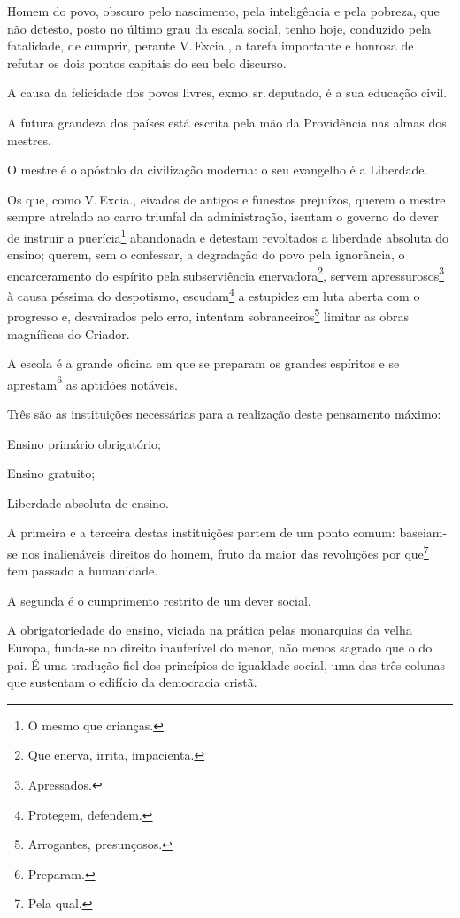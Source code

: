 Homem do povo, obscuro pelo nascimento, pela inteligência e pela
pobreza, que não detesto, posto no último grau da escala social, tenho
hoje, conduzido pela fatalidade, de cumprir, perante V.\,Excia., a tarefa
importante e honrosa de refutar os dois pontos capitais do seu belo
discurso.

A causa da felicidade dos povos livres, exmo.\,sr.\,deputado, é a sua
educação civil.

A futura grandeza dos países está escrita pela mão da Providência nas
almas dos mestres.

O mestre é o apóstolo da civilização moderna: o seu evangelho é a
Liberdade.

Os que, como V.\,Excia., eivados de antigos e funestos prejuízos, querem
o mestre sempre atrelado ao carro triunfal da administração, isentam o
governo do dever de instruir a puerícia\footnote{O mesmo que crianças.}
abandonada e detestam revoltados a liberdade absoluta do ensino; querem,
sem o confessar, a degradação do povo pela ignorância, o encarceramento
do espírito pela subserviência enervadora\footnote{Que enerva, irrita,
  impacienta.}, servem apressurosos\footnote{Apressados.} à causa
péssima do despotismo, escudam\footnote{Protegem, defendem.} a
estupidez em luta aberta com o progresso e, desvairados pelo erro,
intentam sobranceiros\footnote{Arrogantes, presunçosos.} limitar as
obras magníficas do Criador.

A escola é a grande oficina em que se preparam os grandes espíritos e se
aprestam\footnote{Preparam.} as aptidões notáveis.

Três são as instituições necessárias para a realização deste pensamento
máximo:

Ensino primário obrigatório;

Ensino gratuito;

Liberdade absoluta de ensino.

A primeira e a terceira destas instituições partem de um ponto comum:
baseiam-se nos inalienáveis direitos do homem, fruto da maior das
revoluções por que\footnote{Pela qual.} tem passado a humanidade.

A segunda é o cumprimento restrito de um dever social.

A obrigatoriedade do ensino, viciada na prática pelas monarquias da
velha Europa, funda-se no direito inauferível do menor, não menos
sagrado que o do pai. É uma tradução fiel dos princípios de igualdade
social, uma das três colunas que sustentam o edifício da democracia
cristã.

